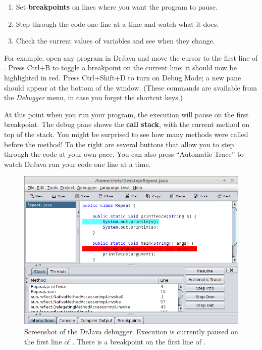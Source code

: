 \begin{enumerate}
\item Set {\bf breakpoints} on lines where you want the program to pause.
\item Step through the code one line at a time and watch what it does.
\item Check the current values of variables and see when they change.
\end{enumerate}

For example, open any program in DrJava and move the cursor to the first line of .
Press Ctrl+B to toggle a breakpoint on the current line; it should now be highlighted in red.
Press Ctrl+Shift+D to turn on Debug Mode; a new pane should appear at the bottom of the window.
(These commands are available from the {\em Debugger} menu, in case you forget the shortcut keys.)


At this point when you run your program, the execution will pause on the first breakpoint.
The debug pane shows the {\bf call stack}, with the current method on top of the stack.
You might be surprised to see how many methods were called before the  method!
To the right are several buttons that allow you to step through the code at your own pace.
You can also press ``Automatic Trace'' to watch DrJava run your code one line at a time.

\begin{figure}[!h]
\includegraphics[width=\textwidth]{debugger.png}
\caption{Screenshot of the DrJava debugger.
Execution is currently paused on the first line of .
There is a breakpoint on the first line of .}
\end{figure}

